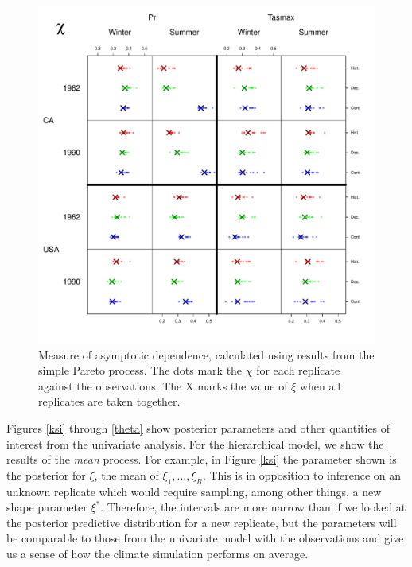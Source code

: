 \begin{figure}
\begin{center}
 \includegraphics[scale=0.61]{figs/chi4.pdf}
\end{center}
\caption{Measure of asymptotic dependence, calculated using results from the simple Pareto process. The dots mark the $\chi$ for each replicate against the observations. The X marks the value of $\xi$ when all replicates are taken together.}
\label{chi}
\end{figure}


Figures \ref{ksi} through \ref{theta} show posterior parameters and other quantities of interest from the univariate analysis. For the hierarchical model, we show the results of the \emph{mean} process. For example, in Figure \ref{ksi} the parameter shown is the posterior for $\xi$, the mean of $\xi_1,\ldots,\xi_R$. This is in opposition to inference on an unknown replicate which would require sampling, among other things, a new shape parameter $\xi^*$. Therefore, the intervals are more narrow than if we looked at the posterior predictive distribution for a new replicate, but the parameters will be comparable to those from the univariate model with the observations and give us a sense of how the climate simulation performs on average.


